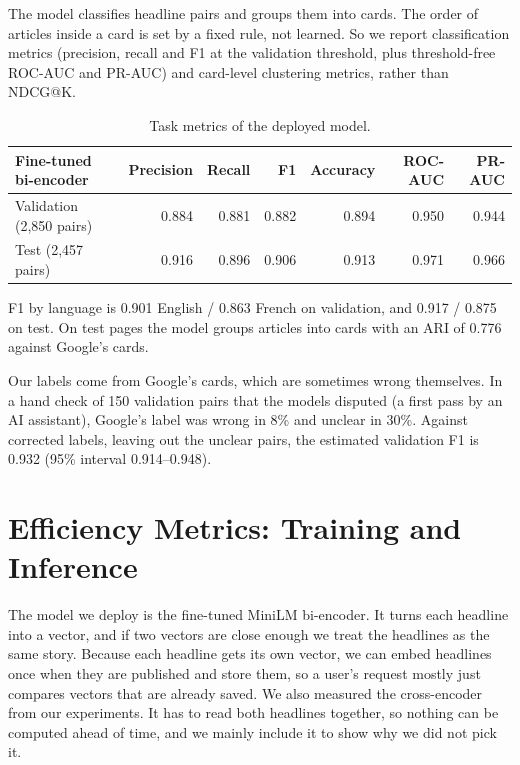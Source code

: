 \documentclass[11pt,letterpaper]{article}
\begin{document}
The model classifies headline pairs and groups them into cards. The order of articles inside a card is set by a fixed rule, not learned. So we report classification metrics (precision, recall and F1 at the validation threshold, plus threshold-free ROC-AUC and PR-AUC) and card-level clustering metrics, rather than NDCG@K.

\begin{table}[H]
\centering\small
\begin{tabular}{lrrrrrr}
\toprule
Fine-tuned bi-encoder & Precision & Recall & F1 & Accuracy & ROC-AUC & PR-AUC \\
\midrule
Validation (2,850 pairs) & 0.884 & 0.881 & 0.882 & 0.894 & 0.950 & 0.944 \\
Test (2,457 pairs)       & 0.916 & 0.896 & 0.906 & 0.913 & 0.971 & 0.966 \\
\bottomrule
\end{tabular}
\caption{Task metrics of the deployed model.}
\end{table}

F1 by language is 0.901 English / 0.863 French on validation, and 0.917 / 0.875 on test. On test pages the model groups articles into cards with an ARI of 0.776 against Google's cards.

Our labels come from Google's cards, which are sometimes wrong themselves. In a hand check of 150 validation pairs that the models disputed (a first pass by an AI assistant), Google's label was wrong in 8\% and unclear in 30\%. Against corrected labels, leaving out the unclear pairs, the estimated validation F1 is 0.932 (95\% interval 0.914--0.948).


\section{Efficiency Metrics: Training and Inference}
\label{sec:efficiency}

The model we deploy is the fine-tuned MiniLM bi-encoder. It turns each headline into a vector, and if two vectors are close enough we treat the headlines as the same story. Because each headline gets its own vector, we can embed headlines once when they are published and store them, so a user's request mostly just compares vectors that are already saved. We also measured the cross-encoder from our experiments. It has to read both headlines together, so nothing can be computed ahead of time, and we mainly include it to show why we did not pick it.
\end{document}
